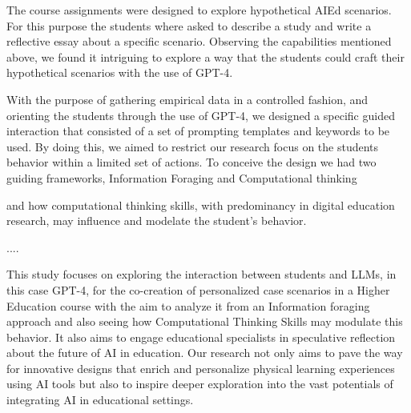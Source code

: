\documentclass[sn-mathphys, Numbered]{sn-jnl}%
\theoremstyle{thmstyleone}%
\theoremstyle{thmstyletwo}%
\theoremstyle{thmstylethree}%
\begin{document}
The course assignments were designed to explore hypothetical AIEd scenarios. For this purpose the students where asked to describe a study and write a reflective essay about a specific scenario. Observing the capabilities mentioned above, we found it intriguing to explore a way that the students could craft their hypothetical scenarios with the use of GPT-4. 

With the purpose of gathering empirical data in a controlled fashion, and orienting the students through the use of GPT-4, we designed a specific guided interaction that consisted of a set of prompting templates and keywords to be used. By doing this, we aimed to restrict our research focus on the students behavior within a limited set of actions. To conceive the design we had two guiding frameworks, Information Foraging and Computational thinking


and how computational thinking skills, with predominancy in digital education research, may influence and modelate the student's behavior.


....












This study focuses on exploring the interaction between students and LLMs, in this case GPT-4, for the co-creation of personalized case scenarios in a Higher Education course with the aim to analyze it from an Information foraging approach and also seeing how Computational Thinking Skills may modulate this behavior. 
It also aims to engage educational specialists in speculative reflection about the future of AI in education. Our research not only aims to pave the way for innovative designs that enrich and personalize physical learning experiences using AI tools but also to inspire deeper exploration into the vast potentials of integrating AI in educational settings. 
\end{document}
